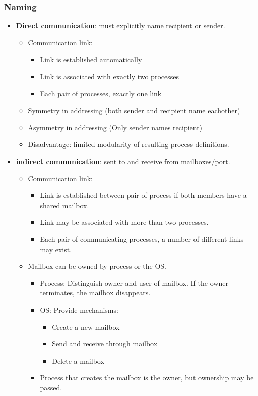 \documentclass[10pt]{report}
\begin{document}
			\subsubsection{Naming}
				\begin{itemize}
					\item \textbf{Direct communication}: must explicitly name recipient or sender.
					\begin{itemize}
						\item Communication link:
						\begin{itemize}
							\item Link is established automatically
							\item Link is associated with exactly two processes
							\item Each pair of processes, exactly one link
						\end{itemize}
						\item Symmetry in addressing (both sender and recipient name eachother)
						\item Asymmetry in addressing (Only sender names recipient)
						\item Disadvantage: limited modularity of resulting process definitions.
					\end{itemize}
					\item \textbf{indirect communication}: sent to and receive from mailboxes/port.
					\begin{itemize}
						\item Communication link:
						\begin{itemize}
							\item Link is established between pair of process if both members have a shared mailbox.
							\item Link may be associated with more than two processes.
							\item Each pair of communicating processes, a number of different links may exist.
						\end{itemize}
						\item Mailbox can be owned by process or the OS.
						\begin{itemize}
							\item Process: Distinguish owner and user of mailbox. If the owner terminates, the mailbox disappears.
							\item OS: Provide mechanisms:
							\begin{itemize}
								\item Create a new mailbox
								\item Send and receive through mailbox
								\item Delete a mailbox
							\end{itemize}
							\item Process that creates the mailbox is the owner, but ownership may be passed.
						\end{itemize}
					\end{itemize}
				\end{itemize}
\end{document}
